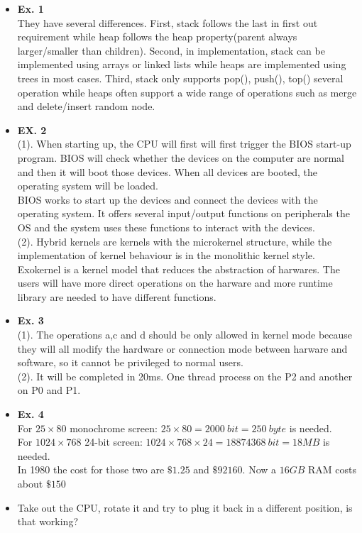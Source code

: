 \documentclass{article}
\begin{document}
\begin{itemize}
\item {\bf Ex. 1}\\
They have several differences. First, stack follows the last in first out requirement while heap follows the heap property(parent always larger/smaller than children). Second, in implementation, stack can be implemented using arrays or linked lists while heaps are implemented using trees in most cases. Third, stack only supports pop(), push(), top() several operation while heaps often support a wide range of operations such as merge and delete/insert random node.
\item {\bf EX. 2}\\
(1). When starting up, the CPU will first will first trigger the BIOS start-up program. BIOS will check whether the devices on the computer are normal and then it will boot those devices. When all devices are booted, the operating system will be loaded.\\
BIOS works to start up the devices and connect the devices with the operating system. It offers several input/output functions on peripherals the OS and the system uses these functions to interact with the devices.\\
(2). Hybrid kernels are kernels with the microkernel structure, while the implementation of kernel behaviour is in the monolithic kernel style.\\
Exokernel is a kernel model that reduces the abstraction of harwares. The users will have more direct operations on the harware and more runtime library are needed to have different functions.
\item {\bf Ex. 3}\\
(1). The operations a,c and d should be only allowed in kernel mode because they will all modify the hardware or connection mode between harware and software, so it cannot be privileged to normal users.\\
(2). It will be completed in 20ms. One thread process on the P2 and another on P0 and P1.
\item {\bf Ex. 4}\\
For $25\times 80$ monochrome screen: $25\times 80=2000\ bit = 250\ byte$ is needed.\\
For $1024\times 768$ 24-bit screen: $1024\times 768\times 24 = 18874368\ bit = 18MB$ is needed.\\
In 1980 the cost for those two are $\$1.25$ and $\$92160$. Now a $16GB$ RAM costs about $\$150$
\item Take out the CPU, rotate it and try to plug it back in a different position, is that working?\\

\end{itemize}
\end{document}
